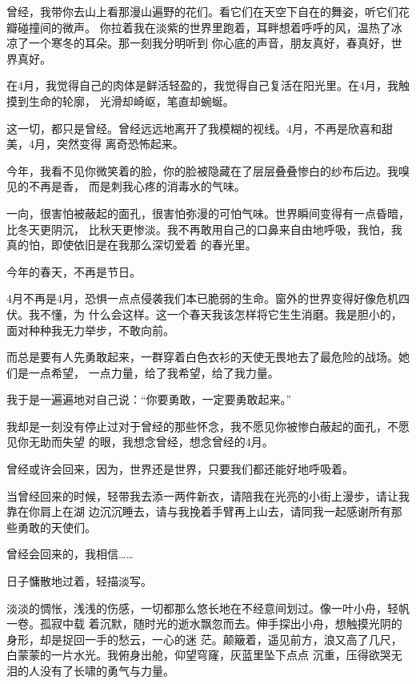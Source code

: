 		曾经，我带你去山上看那漫山遍野的花们。看它们在天空下自在的舞姿，听它们花瓣碰撞间的微声。
	你拉着我在淡紫的世界里跑着，耳畔想着呼呼的风，温热了冰凉了一个寒冬的耳朵。那一刻我分明听到
	你心底的声音，朋友真好，春真好，世界真好。

		在4月，我觉得自己的肉体是鲜活轻盈的，我觉得自己复活在阳光里。在4月，我触摸到生命的轮廓，
	光滑却崎岖，笔直却蜿蜒。

		这一切，都只是曾经。曾经远远地离开了我模糊的视线。4月，不再是欣喜和甜美，4月，突然变得
	离奇恐怖起来。

		今年，我看不见你微笑着的脸，你的脸被隐藏在了层层叠叠惨白的纱布后边。我嗅见的不再是香，
	而是刺我心疼的消毒水的气味。

		一向，很害怕被蔽起的面孔，很害怕弥漫的可怕气味。世界瞬间变得有一点昏暗，比冬天更阴沉，
	比秋天更惨淡。我不再敢用自己的口鼻来自由地呼吸，我怕，我真的怕，即使依旧是在我那么深切爱着
	的春光里。

		今年的春天，不再是节日。

		4月不再是4月，恐惧一点点侵袭我们本已脆弱的生命。窗外的世界变得好像危机四伏。我不懂，为
	什么会这样。这一个春天我该怎样将它生生消磨。我是胆小的，面对种种我无力举步，不敢向前。

		而总是要有人先勇敢起来，一群穿着白色衣衫的天使无畏地去了最危险的战场。她们是一点希望，
	一点力量，给了我希望，给了我力量。

		我于是一遍遍地对自己说：“你要勇敢，一定要勇敢起来。”

		我却是一刻没有停止过对于曾经的那些怀念，我不愿见你被惨白蔽起的面孔，不愿见你无助而失望
	的眼，我想念曾经，想念曾经的4月。

		曾经或许会回来，因为，世界还是世界，只要我们都还能好地呼吸着。

		当曾经回来的时候，轻带我去添一两件新衣，请陪我在光亮的小街上漫步，请让我靠在你肩上在湖
	边沉沉睡去，请与我挽着手臂再上山去，请同我一起感谢所有那些勇敢的天使们。

		曾经会回来的，我相信……

	\endwriting



		日子慵散地过着，轻描淡写。

		淡淡的惆怅，浅浅的伤感，一切都那么悠长地在不经意间划过。像一叶小舟，轻帆一卷。孤寂中载
	着沉默，随时光的逝水飘忽而去。伸手探出小舟，想触摸光阴的身形，却是捉回一手的愁云，一心的迷
	茫。颠簸着，遥见前方，浪又高了几尺，白蒙蒙的一片水光。我俯身出舱，仰望穹窿，灰蓝里坠下点点
	沉重，压得欲哭无泪的人没有了长啸的勇气与力量。

